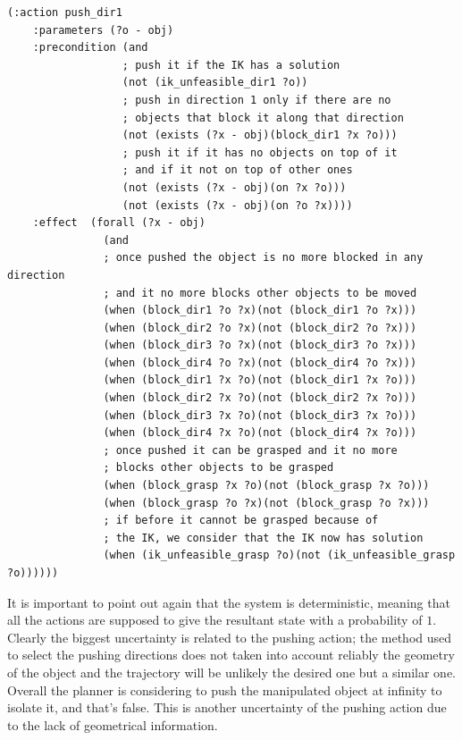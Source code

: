 \lstset{language=pddl}
\begin{lstlisting}[caption={PDDL syntax of the pushing action along direction 1},label=pushPDDL]
(:action push_dir1
    :parameters (?o - obj)
    :precondition (and
                  ; push it if the IK has a solution
                  (not (ik_unfeasible_dir1 ?o)) 
                  ; push in direction 1 only if there are no
                  ; objects that block it along that direction
                  (not (exists (?x - obj)(block_dir1 ?x ?o)))
                  ; push it if it has no objects on top of it
                  ; and if it not on top of other ones
                  (not (exists (?x - obj)(on ?x ?o)))
                  (not (exists (?x - obj)(on ?o ?x))))
    :effect  (forall (?x - obj)
               (and
               ; once pushed the object is no more blocked in any direction
               ; and it no more blocks other objects to be moved
               (when (block_dir1 ?o ?x)(not (block_dir1 ?o ?x)))
               (when (block_dir2 ?o ?x)(not (block_dir2 ?o ?x)))
               (when (block_dir3 ?o ?x)(not (block_dir3 ?o ?x)))
               (when (block_dir4 ?o ?x)(not (block_dir4 ?o ?x)))
               (when (block_dir1 ?x ?o)(not (block_dir1 ?x ?o)))
               (when (block_dir2 ?x ?o)(not (block_dir2 ?x ?o)))
               (when (block_dir3 ?x ?o)(not (block_dir3 ?x ?o)))
               (when (block_dir4 ?x ?o)(not (block_dir4 ?x ?o)))
               ; once pushed it can be grasped and it no more
               ; blocks other objects to be grasped
               (when (block_grasp ?x ?o)(not (block_grasp ?x ?o)))
               (when (block_grasp ?o ?x)(not (block_grasp ?o ?x)))
               ; if before it cannot be grasped because of 
               ; the IK, we consider that the IK now has solution
               (when (ik_unfeasible_grasp ?o)(not (ik_unfeasible_grasp ?o))))))
\end{lstlisting}

\mbox{}


 It is important to point out again that the system is deterministic, meaning that all the actions are supposed to give the resultant state with a probability of $1$. Clearly the biggest uncertainty is related to the pushing action; the method used to select the pushing directions does not taken into account reliably the geometry of the object and the trajectory will be unlikely the desired one but a similar one. Overall the planner is considering to push the manipulated object at infinity to isolate it, and that's false. This is another uncertainty of the pushing action due to the lack of geometrical information.
 
